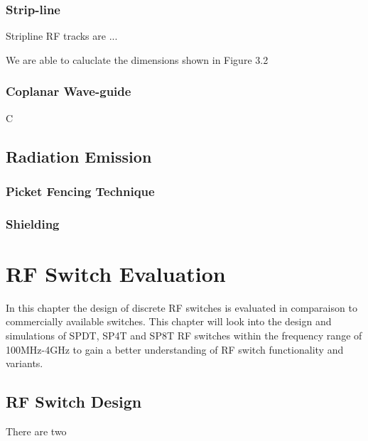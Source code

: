 \documentclass[12pt,openany,a4paper]{book}
\begin{document}


\subsection{Strip-line}
Stripline RF tracks are ... \newline

We are able to caluclate the dimensions shown in Figure 3.2

\subsection{Coplanar Wave-guide}
C












\section{Radiation Emission}


\subsection{Picket Fencing Technique}


\subsection{Shielding}










\chapter{RF Switch Evaluation}
In this chapter the design of discrete RF switches is evaluated in comparaison to commercially available switches. This chapter will look into the design and simulations of SPDT, SP4T and SP8T RF switches within the frequency range of 100MHz-4GHz to gain a better understanding of RF switch functionality and variants.
 
\section{RF Switch Design}
There are two 
\end{document}
